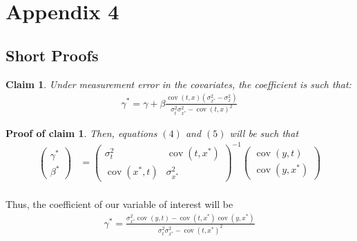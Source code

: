 \documentclass[10pt]{article}
\newtheorem{claim}{Claim}
\newtheorem{claimproof}{Proof of claim}[claim]
\begin{document}
\break
\newpage

	\section*{Appendix 4}
	\subsection*{Short Proofs}

	\begin{claim}
	Under measurement error in the covariates, the coefficient is such that:
	\begin{align}
            \gamma^* = \gamma + \beta\frac{\operatorname{cov}(t,x)(\sigma^2_{x^*}-\sigma^2_x)}{\sigma_{t}^2\sigma_{x^*}^2-\operatorname{cov}({t,x})^2}
        \end{align}
	\end{claim}
	
\begin{claimproof}

Then, equations $(4)$ and $(5)$ will be such that
            \begin{align}
                    \left(\begin{array}{l}
                {\gamma}^* \\
                {\beta}^*
                \end{array}\right)&=\left(\begin{array}{cc}
                {\sigma}^2_{t} & \operatorname{cov}({t,x^*}) \\
                \operatorname{cov}({x^*,t}) & {\sigma}_{x^*}^2
                \end{array}\right)^{-1}\left(\begin{array}{c}
                \operatorname{cov}{(y,t)} \\
                \operatorname{cov}{(y,x^*)}
                \end{array}\right) \\
                \end{align}
           
\end{claimproof}	
 
            Thus, the coefficient of our variable of interest will be
            \begin{align}
            {\gamma}^* =\frac{\sigma_{x^*}^2\operatorname{cov}{(y,t)}-\operatorname{cov}({t,x^*})\operatorname{cov}{(y,x^*)}}{\sigma_{t}^2\sigma_{x^*}^2-\operatorname{cov}({t,x^*})^2}
        \end{align}
\end{document}

